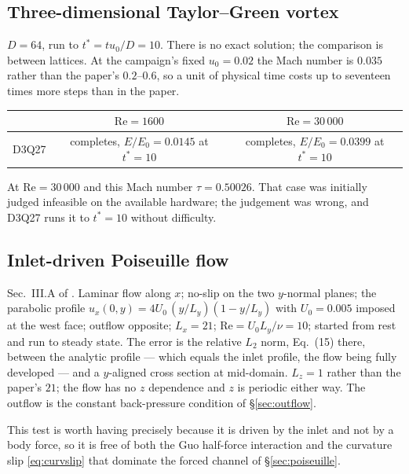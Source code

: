 \documentclass[11pt,a4paper]{article}
\begin{document}
\subsection{Three-dimensional Taylor--Green vortex}

$D=64$, run to $t^\ast = t u_0/D = 10$. There is no exact solution; the
comparison is between lattices. At the campaign's fixed $u_0=0.02$ the Mach
number is $0.035$ rather than the paper's $0.2$--$0.6$, so a unit of physical
time costs up to seventeen times more steps than in the paper.

\begin{center}\small
\begin{tabular}{lcc}
\toprule
 & $\mathrm{Re}=1600$ & $\mathrm{Re}=30\,000$ \\
\midrule
D3Q27 & completes, $E/E_0=0.0145$ at $t^\ast=10$ & completes, $E/E_0=0.0399$ at $t^\ast=10$ \\
\bottomrule
\end{tabular}
\end{center}

\noindent At $\mathrm{Re}=30\,000$ and this Mach number $\tau=0.50026$. That
case was initially judged infeasible on the available hardware; the judgement
was wrong, and D3Q27 runs it to $t^\ast=10$ without difficulty.

\subsection{Inlet-driven Poiseuille flow}
\label{sec:poisinlet}

Sec.~III.A of \cite{derosis2017pre}. Laminar flow along $x$; no-slip on the two
$y$-normal planes; the parabolic profile $u_x(0,y) = 4U_0\,(y/L_y)(1-y/L_y)$
with $U_0 = 0.005$ imposed at the west face; outflow opposite; $L_x = 21$;
$\mathrm{Re} = U_0 L_y/\nu = 10$; started from rest and run to steady state. The
error is the relative $L_2$ norm, Eq.~(15) there, between the analytic profile
--- which equals the inlet profile, the flow being fully developed --- and a
$y$-aligned cross section at mid-domain. $L_z=1$ rather than the paper's $21$;
the flow has no $z$ dependence and $z$ is periodic either way. The outflow is
the constant back-pressure condition of \S\ref{sec:outflow}.

This test is worth having precisely because it is driven by the inlet and not by
a body force, so it is free of both the Guo half-force interaction and the
curvature slip \eqref{eq:curvslip} that dominate the forced channel of
\S\ref{sec:poiseuille}.
\end{document}
